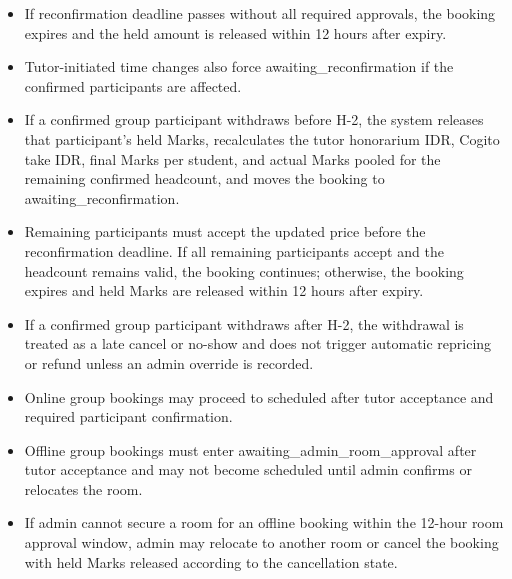 \documentclass[11pt,a4paper]{article}
\begin{document}
\begin{itemize}
    \item If reconfirmation deadline passes without all required approvals, the booking expires and the held amount is released within 12 hours after expiry.
    \item Tutor-initiated time changes also force awaiting\_reconfirmation if the confirmed participants are affected.
    \item If a confirmed group participant withdraws before H-2, the system releases that participant's held Marks, recalculates the tutor honorarium IDR, Cogito take IDR, final Marks per student, and actual Marks pooled for the remaining confirmed headcount, and moves the booking to awaiting\_reconfirmation.
    \item Remaining participants must accept the updated price before the reconfirmation deadline. If all remaining participants accept and the headcount remains valid, the booking continues; otherwise, the booking expires and held Marks are released within 12 hours after expiry.
    \item If a confirmed group participant withdraws after H-2, the withdrawal is treated as a late cancel or no-show and does not trigger automatic repricing or refund unless an admin override is recorded.
    \item Online group bookings may proceed to scheduled after tutor acceptance and required participant confirmation.
    \item Offline group bookings must enter awaiting\_admin\_room\_approval after tutor acceptance and may not become scheduled until admin confirms or relocates the room.
    \item If admin cannot secure a room for an offline booking within the 12-hour room approval window, admin may relocate to another room or cancel the booking with held Marks released according to the cancellation state.
\end{itemize}
\end{document}
